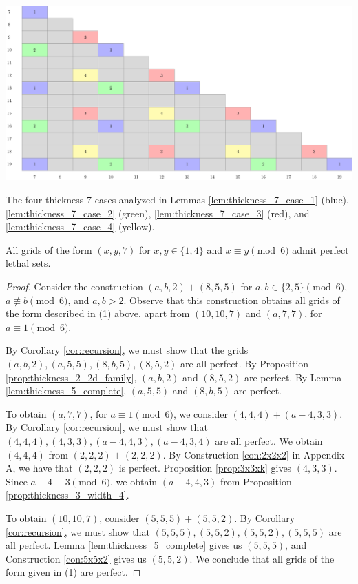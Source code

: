 \begin{table}[]
\centering
\includegraphics[width=\textwidth]{tables/4/thickness_7_cases.pdf}
\caption{The four thickness 7 cases analyzed in Lemmas \ref{lem:thickness_7_case_1} (blue), \ref{lem:thickness_7_case_2} (green), \ref{lem:thickness_7_case_3} (red), and \ref{lem:thickness_7_case_4} (yellow).}
\label{fig:thickness_7_cases}
\end{table}

\begin{lem}
\label{lem:thickness_7_case_1}
All grids of the form $(x,y,7)$ for $x,y \in \{1,4\}$ and $x \equiv y \pmod 6$ admit perfect lethal sets.
\end{lem}

\begin{proof}
Consider the construction $(a,b,2) + (8,5,5)$ for $a,b \in \{2,5\} \pmod 6$, $a \not\equiv b \pmod 6$, and $a,b > 2$. Observe that this construction obtains all grids of the form described in (1) above, apart from $(10,10,7)$ and $(a, 7,7)$, for $a \equiv 1 \pmod 6$. 

By Corollary \ref{cor:recursion}, we must show that the grids $(a,b,2), (a,5,5), (8,b,5), (8,5,2)$ are all perfect. By Proposition \ref{prop:thickness_2_2d_family}, $(a,b,2)$ and $(8,5,2)$ are perfect. By Lemma \ref{lem:thickness_5_complete}, $(a,5,5)$ and $(8,b,5)$ are perfect. 

To obtain $(a,7,7)$, for $a \equiv 1 \pmod 6$, we consider $(4,4,4) + (a-4,3,3)$. By Corollary \ref{cor:recursion}, we must show that $(4,4,4), (4,3,3), (a-4,4,3), (a-4,3,4)$ are all perfect. We obtain $(4,4,4)$ from $(2,2,2)+(2,2,2)$. By Construction \ref{con:2x2x2} in Appendix A, we have that $(2,2,2)$ is perfect. Proposition \ref{prop:3x3xk} gives $(4,3,3)$. Since $a-4 \equiv 3 \pmod 6$, we obtain $(a-4,4,3)$ from Proposition \ref{prop:thickness_3_width_4}.

To obtain $(10,10,7)$, consider $(5,5,5) + (5,5,2)$. By Corollary \ref{cor:recursion}, we must show that $(5,5,5), (5,5,2), (5,5,2), (5,5,5)$ are all perfect. Lemma \ref{lem:thickness_5_complete} gives us $(5,5,5)$, and Construction \ref{con:5x5x2} gives us $(5,5,2)$. We conclude that all grids of the form given in (1) are perfect. 
\end{proof}

